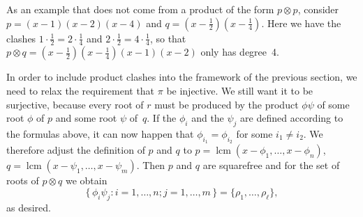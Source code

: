 \documentclass{sig-alternate}
\def\lcm{\operatorname{lcm}}
\begin{document}
As an example that does not come from a product of the form $p\otimes p$,
consider $p=(x-1)(x-2)(x-4)$ and $q=(x-\tfrac12)(x-\tfrac14)$. Here we have
the clashes $1\cdot\frac12=2\cdot\frac14$ and $2\cdot\frac12=4\cdot\frac14$,
so that $p\otimes q=(x-\tfrac12)(x-\tfrac14)(x-1)(x-2)$ only has degree~4.

In order to include product clashes into the framework of the previous section,
we need to relax the requirement that $\pi$ be injective. We still want it to
be surjective, because every root of $r$ must be produced by the product $\phi\psi$
of some root $\phi$ of $p$ and some root $\psi$ of~$q$. If the $\phi_i$ and the
$\psi_j$ are defined according to the formulas above, it can now happen that
$\phi_{i_1}=\phi_{i_2}$ for some $i_1\neq i_2$. We therefore adjust the definition
of $p$ and $q$ to $p=\lcm(x-\phi_1,\dots,x-\phi_n)$, $q=\lcm(x-\psi_1,\dots,x-\psi_m)$.
Then $p$ and $q$ are squarefree and for the set of roots of $p\otimes q$
we obtain
\[
\{\,\phi_i\psi_j:i=1,\dots,n;j=1,\dots,m\,\}=\{\rho_1,\dots,\rho_\ell\},
\]
as desired.
\end{document}

